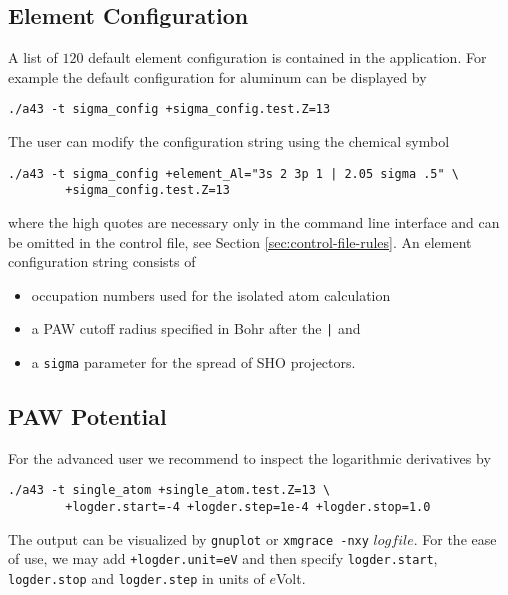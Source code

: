 \documentclass[oribibl]{llncs}
\newcommand{\ttt}[1]{\texttt{#1}}
\begin{document}
\subsection{Element Configuration} \label{sec:sigma-config}
%
A list of $120$ default element configuration is contained in the application.
For example the default configuration for aluminum can be displayed by
\begin{verbatim}
./a43 -t sigma_config +sigma_config.test.Z=13
\end{verbatim}
The user can modify the configuration string using the chemical symbol
\begin{verbatim}
./a43 -t sigma_config +element_Al="3s 2 3p 1 | 2.05 sigma .5" \
 		+sigma_config.test.Z=13
\end{verbatim}
where the high quotes are necessary only in the command line interface
and can be omitted in the control file, see Section \ref{sec:control-file-rules}.
%
\noindent
An element configuration string consists of
\begin{itemize}
	\item occupation numbers used for the isolated atom calculation
	\item a \ac{PAW} cutoff radius specified in Bohr after the \ttt{|} and
	\item a \ttt{sigma} parameter for the spread of \ac{SHO} projectors.
\end{itemize}

\subsection{PAW Potential} \label{sec:single-atom}
%
For the advanced user we recommend to inspect the logarithmic derivatives by
\begin{verbatim}
./a43 -t single_atom +single_atom.test.Z=13 \
        +logder.start=-4 +logder.step=1e-4 +logder.stop=1.0
\end{verbatim}
The output can be visualized by \ttt{gnuplot} or \ttt{xmgrace -nxy} $logfile$.
%
\noindent
For the ease of use, we may add \ttt{+logder.unit=eV} and then specify
\ttt{logder.start}, \ttt{logder.stop} and \ttt{logder.step} in units of $e$Volt.

\end{document}
